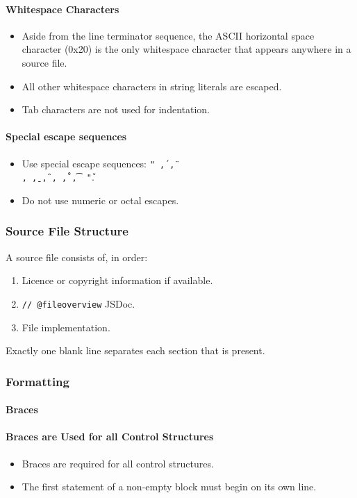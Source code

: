 \documentclass[a4paper, 11pt]{article}
\begin{document}
\paragraph{Whitespace Characters}
\begin{itemize}
\item Aside from the line terminator sequence, the ASCII horizontal space character (0x20) is the only whitespace character that appears anywhere in a source file.
\item All other whitespace characters in string literals are escaped.
\item Tab characters are not used for indentation.
\end{itemize}

\paragraph{Special escape sequences}
\begin{itemize}
\item Use special escape sequences: \texttt{" \', \", \\, \b, \f, \n, \r, \t, \v "}.
\item Do not use numeric or octal escapes.
\end{itemize}

\subsubsection{Source File Structure}
A source file consists of, in order:
\begin{enumerate}
\item Licence or copyright information if available.
\item \texttt{// @fileoverview} JSDoc.
\item File implementation.
\end{enumerate}
Exactly one blank line separates each section that is present.

\subsubsection{Formatting}

\paragraph{Braces}

\paragraph{Braces are Used for all Control Structures}
\begin{itemize}
\item Braces are required for all control structures.
\item The first statement of a non-empty block must begin on its own line.
\end{itemize}
\end{document}
